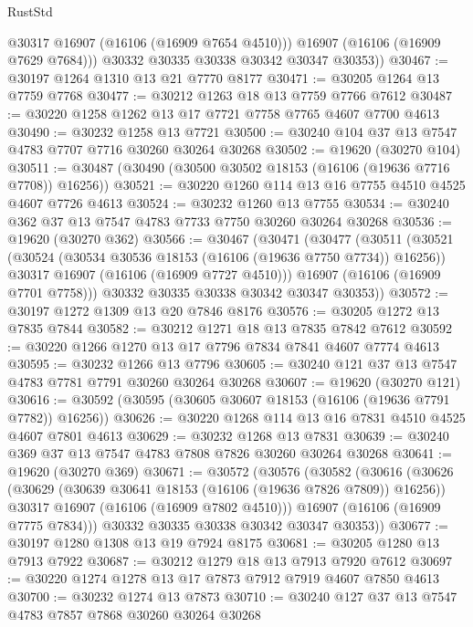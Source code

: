 \begin{lexlean}{RustStd}
\begin{coremodule}
            @30317
            @16907
            (@16106 (@16909 @7654 @4510)))
          @16907
          (@16106 (@16909 @7629 @7684)))
        @30332
        @30335
        @30338
        @30342
        @30347
        @30353))
@30467 := @30197 @1264 @1310 @13 @21 @7770 @8177
@30471 := @30205 @1264 @13 @7759 @7768
@30477 := @30212 @1263 @18 @13 @7759 @7766 @7612
@30487 := @30220 @1258 @1262 @13 @17 @7721 @7758 @7765 @4607 @7700 @4613
@30490 := @30232 @1258 @13 @7721
@30500 := @30240 @104 @37 @13 @7547 @4783 @7707 @7716 @30260 @30264 @30268
@30502 := @19620 (@30270 @104)
@30511 := @30487 (@30490 (@30500 @30502 @18153 (@16106 (@19636 @7716 @7708)) @16256))
@30521 := @30220 @1260 @114 @13 @16 @7755 @4510 @4525 @4607 @7726 @4613
@30524 := @30232 @1260 @13 @7755
@30534 := @30240 @362 @37 @13 @7547 @4783 @7733 @7750 @30260 @30264 @30268
@30536 := @19620 (@30270 @362)
@30566 := @30467
    (@30471
      (@30477
        (@30511
          (@30521
            (@30524 (@30534 @30536 @18153 (@16106 (@19636 @7750 @7734)) @16256))
            @30317
            @16907
            (@16106 (@16909 @7727 @4510)))
          @16907
          (@16106 (@16909 @7701 @7758)))
        @30332
        @30335
        @30338
        @30342
        @30347
        @30353))
@30572 := @30197 @1272 @1309 @13 @20 @7846 @8176
@30576 := @30205 @1272 @13 @7835 @7844
@30582 := @30212 @1271 @18 @13 @7835 @7842 @7612
@30592 := @30220 @1266 @1270 @13 @17 @7796 @7834 @7841 @4607 @7774 @4613
@30595 := @30232 @1266 @13 @7796
@30605 := @30240 @121 @37 @13 @7547 @4783 @7781 @7791 @30260 @30264 @30268
@30607 := @19620 (@30270 @121)
@30616 := @30592 (@30595 (@30605 @30607 @18153 (@16106 (@19636 @7791 @7782)) @16256))
@30626 := @30220 @1268 @114 @13 @16 @7831 @4510 @4525 @4607 @7801 @4613
@30629 := @30232 @1268 @13 @7831
@30639 := @30240 @369 @37 @13 @7547 @4783 @7808 @7826 @30260 @30264 @30268
@30641 := @19620 (@30270 @369)
@30671 := @30572
    (@30576
      (@30582
        (@30616
          (@30626
            (@30629 (@30639 @30641 @18153 (@16106 (@19636 @7826 @7809)) @16256))
            @30317
            @16907
            (@16106 (@16909 @7802 @4510)))
          @16907
          (@16106 (@16909 @7775 @7834)))
        @30332
        @30335
        @30338
        @30342
        @30347
        @30353))
@30677 := @30197 @1280 @1308 @13 @19 @7924 @8175
@30681 := @30205 @1280 @13 @7913 @7922
@30687 := @30212 @1279 @18 @13 @7913 @7920 @7612
@30697 := @30220 @1274 @1278 @13 @17 @7873 @7912 @7919 @4607 @7850 @4613
@30700 := @30232 @1274 @13 @7873
@30710 := @30240 @127 @37 @13 @7547 @4783 @7857 @7868 @30260 @30264 @30268

\end{coremodule}
\end{lexlean}
